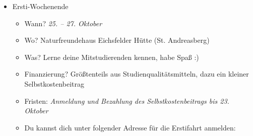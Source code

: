 \begin{itemize}
    \item Ersti-Wochenende
        \begin{itemize}
            \item Wann? \textit{25. – 27. Oktober}
            \item Wo? Naturfreundehaus Eichsfelder Hütte (St. Andreasberg)
            \item Was? Lerne deine Mitstudierenden kennen, habe Spaß :)
            \item Finanzierung? Größtenteils aus Studienqualitätsmitteln, dazu ein kleiner Selbstkostenbeitrag
            \item Fristen: \textit{Anmeldung und Bezahlung des Selbstkostenbeitrags bis 23. Oktober}
            \item Du kannst dich unter folgender Adresse für die Erstifahrt anmelden: 
        \end{itemize}
    \end{itemize}

